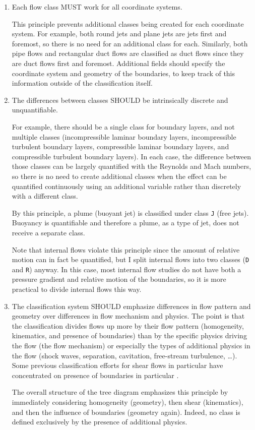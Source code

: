 \begin{enumerate}
\item
Each flow class MUST work for all coordinate systems.

This principle prevents additional classes being created for each coordinate
system.  For example, both round jets and plane jets are jets first and
foremost, so there is no need for an additional class for each.  Similarly,
both pipe flows and rectangular duct flows are classified as duct flows since
they are duct flows first and foremost.  Additional fields should specify the
coordinate system and geometry of the boundaries, to keep track of this
information outside of the classification itself.


\item
The differences between classes SHOULD be intrinsically discrete and
unquantifiable.

For example, there should be a single class for boundary layers, and not
multiple classes (incompressible laminar boundary layers, incompressible
turbulent boundary layers, compressible laminar boundary layers, and
compressible turbulent boundary layers).  In each case, the difference between
those classes can be largely quantified with the Reynolds and Mach numbers, so
there is no need to create additional classes when the effect can be quantified
continuously using an additional variable rather than discretely with a
different class.

By this principle, a plume (buoyant jet) is classified under class \texttt{J}
(free jets).  Buoyancy is quantifiable and therefore a plume, as a type of jet,
does not receive a separate class.

Note that internal flows violate this principle since the amount of relative
motion can in fact be quantified, but I split internal flows into two classes
(\texttt{D} and \texttt{R}) anyway.  In this case, most internal flow studies
do not have both a pressure gradient and relative motion of the boundaries, so
it is more practical to divide internal flows this way.


\item
The classification system SHOULD emphasize differences in flow pattern and
geometry over differences in flow mechanism and physics.  The point is that the
classification divides flows up more by their flow pattern (homogeneity,
kinematics, and presence of boundaries) than by the specific physics driving
the flow (the flow mechanism) or especially the types of additional physics in
the flow (shock waves, separation, cavitation, free-stream turbulence, \ldots).
Some previous classification efforts for shear flows in particular have
concentrated on presence of boundaries in particular
\citep{KovasznayLSG+1967+eng+JOUR,FernholzHH+1976+eng+CHAP,ERCOFTAC+DBASE}.

The overall structure of the tree diagram emphasizes this principle by
immediately considering homogeneity (geometry), then shear (kinematics), and
then the influence of boundaries (geometry again).  Indeed, no class is defined
exclusively by the presence of additional physics.



\end{enumerate}



